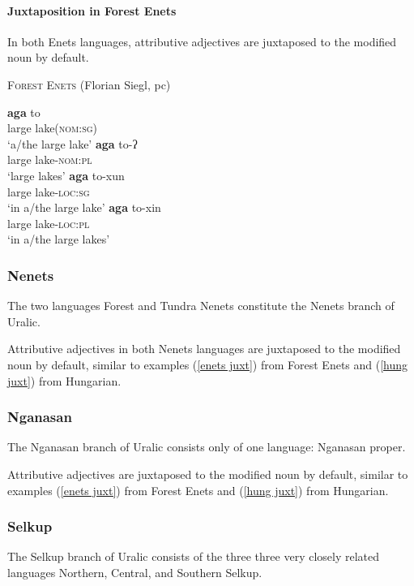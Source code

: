\paragraph{Juxtaposition in Forest Enets}
In both Enets languages, attributive adjectives are juxtaposed to the modified noun by default.
\begin{exe}
\ex \textsc{Forest Enets} (Florian Siegl, pc) \label{enets juxt}%
\begin{xlist}
\ex 
\gll	\textbf{aga} to\\
	large lake(\textsc{nom:sg})\\
\glt	‘a/the large lake’
\ex 
\gll	\textbf{aga} to-ʔ\\
	large lake\textsc{-nom:pl}\\
\glt	‘large lakes’
\ex 
\gll	\textbf{aga} to-xun\\
	large lake\textsc{-loc:sg}\\
\glt	‘in a/the large lake’
\ex 
\gll	\textbf{aga} to-xin\\
	large lake\textsc{-loc:pl}\\
\glt	‘in a/the large lakes’
\end{xlist}
\end{exe}

\subsubsection{Nenets}
The two languages Forest and Tundra Nenets constitute the Nenets branch of Uralic.

Attributive adjectives in both Nenets languages are juxtaposed to the modified noun by default, similar to examples (\ref{enets juxt}) from Forest Enets and (\ref{hung juxt}) from Hungarian.

\subsubsection{Nganasan}
The Nganasan branch of Uralic consists only of one language: Nganasan proper.

\noindent Attributive adjectives are juxtaposed to the modified noun by default, similar to examples (\ref{enets juxt}) from Forest Enets and (\ref{hung juxt}) from Hungarian.

\subsubsection{Selkup}
The Selkup branch of Uralic consists of the three three very closely related languages Northern, Central, and Southern Selkup.

